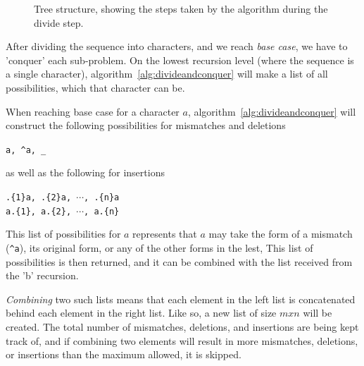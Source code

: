 \documentclass[12pt]{article}
\theoremstyle{definition}
\begin{document}
\begin{figure}[H]
	\centering
	\caption{Tree structure, showing the steps taken by the algorithm during the divide step.}
	\label{fig:tree_example}
\end{figure}

After dividing the sequence into characters, and we reach \emph{base case}, we have to 'conquer' each sub-problem. On the lowest recursion level (where the sequence is a single character), algorithm~\ref{alg:divideandconquer} will make a list of all possibilities, which that character can be.

\begin{example}[label=example:possibilities]
When reaching base case for a character $a$, algorithm~\ref{alg:divideandconquer} will construct the following possibilities for mismatches and deletions

\begin{center}
	\texttt{a, \^{}a, \_}
\end{center}

\noindent as well as the following for insertions

\begin{center}
	\texttt{.\{1\}a, .\{2\}a, $\cdots$, .\{n\}a} \\
	\texttt{a.\{1\}, a.\{2\}, $\cdots$, a.\{n\}}
\end{center}

\noindent This list of possibilities for $a$ represents that $a$ may take the form of a mismatch (\texttt{\^{}a}), its original form, or any of the other forms in the lest, This list of possibilities is then returned, and it can be combined with the list received from the 'b' recursion.
\end{example}

\emph{Combining} two such lists means that each element in the left list is concatenated behind each element in the right list. Like so, a new list of size $m x n$ will be created. The total number of mismatches, deletions, and insertions are being kept track of, and if combining two elements will result in more mismatches, deletions, or insertions than the maximum allowed, it is skipped.
\end{document}

